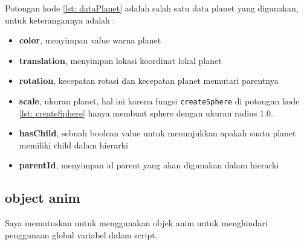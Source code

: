 Potongan kode \ref{lst: dataPlanet} adalah salah satu data planet yang digunakan, untuk keterangannya adalah :

\begin{itemize}
  \item \textbf{color}, menyimpan value warna planet
  \item \textbf{translation}, menyimpan lokasi koordinat lokal planet
  \item \textbf{rotation}, kecepatan rotasi dan kecepatan planet memutari parentnya
  \item \textbf{scale}, ukuran planet, hal ini karena fungsi \texttt{createSphere} di potongan kode \ref{lst: createSphere} hanya membuat sphere dengan ukuran radius 1.0.
  \item \textbf{hasChild}, sebuah boolean value untuk menunjukkan apakah suatu planet memiliki child dalam hierarki
  \item \textbf{parentId}, menyimpan id parent yang akan digunakan dalam hierarki
\end{itemize}

\subsection*{object anim}

Saya memutuskan untuk menggunakan objek anim untuk menghindari penggunaan global variabel dalam script.


